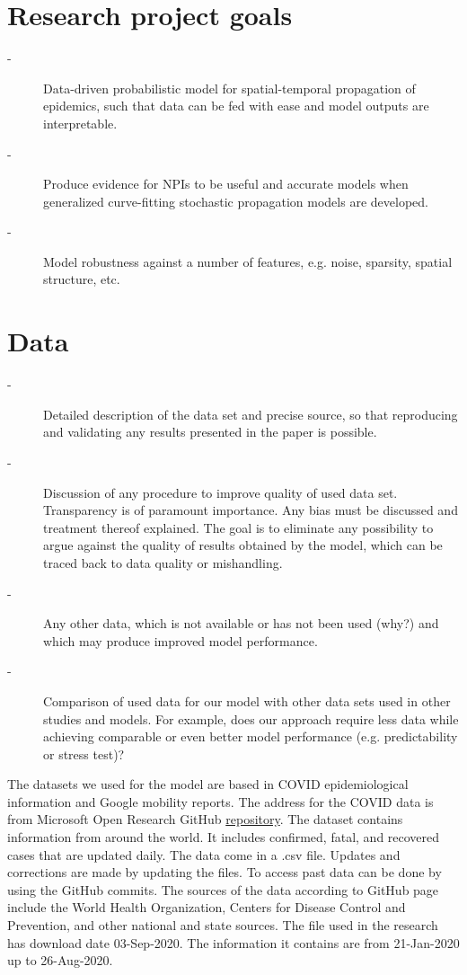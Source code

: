 \documentclass[11pt,a4paper,amssymb,amsmath, tightenlines]{article}
\numberwithin{equation}{section}
\begin{document}
\section{Research project goals}
\begin{description}
	\item[-] Data-driven probabilistic model for spatial-temporal propagation of epidemics, such that data can be fed with ease and model outputs are interpretable.
	\item[-] Produce evidence for NPIs to be useful and accurate models when generalized curve-fitting stochastic propagation models are developed. 
	\item[-] Model robustness against a number of features, e.g. noise, sparsity, spatial structure, etc.
\end{description}
\section{Data}
\begin{description}
	\item[-] Detailed description of the data set and precise source, so that reproducing and validating any results presented in the paper is possible. 
	\item[-] Discussion of any procedure to improve quality of used data set. Transparency is of paramount importance. Any bias must be discussed and treatment thereof explained. The goal is to eliminate any possibility to argue against the quality of results obtained by the model, which can be traced back to data quality or mishandling. 
	\item[-] Any other data, which is not available or has not been used (why?) and which may produce improved model performance.
	\item[-] Comparison of used data for our model with other data sets used in other studies and models. For example, does our approach require less data while achieving comparable or even better model performance (e.g. predictability or stress test)?
\end{description}
The datasets we used for the model are based in COVID epidemiological information and Google mobility reports. The address for the COVID data is from Microsoft Open Research GitHub \href{https://github.com/microsoft/Bing-COVID-19-Data}{repository}. The dataset contains information from around the world. It includes confirmed, fatal, and recovered cases that are updated daily. The data come in a .csv file. Updates and corrections are made by updating the files. To access past data can be done by using the GitHub commits. The sources of the data according to GitHub page include the World Health Organization, Centers for Disease Control and Prevention, and other national and state sources. The file used in the research has download date 03-Sep-2020. The information it contains are from 21-Jan-2020 up to 26-Aug-2020.
\end{document}
